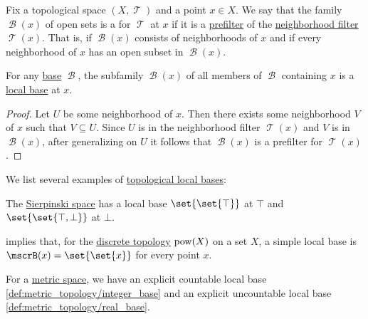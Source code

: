 \begin{definition}\label{def:topological_local_base}
  Fix a topological space \( (X, \mscrT) \) and a point \( x \in X \). We say that the family \( \mscrB(x) \) of open sets is a  for \( \mscrT \) at \( x \) if it is a \hyperref[def:prefilter]{prefilter} of the \hyperref[def:neighborhood_system]{neighborhood filter} \( \mscrT(x) \). That is, if \( \mscrB(x) \) consists of neighborhoods of \( x \) and if every neighborhood of \( x \) has an open subset in \( \mscrB(x) \).
\end{definition}

\begin{proposition}\label{thm:global_base_to_local_base}
  For any \hyperref[def:topological_base]{base} \( \mscrB \), the subfamily \( \mscrB(x) \) of all members of \( \mscrB \) containing \( x \) is a \hyperref[def:topological_local_base]{local base} at \( x \).
\end{proposition}
\begin{proof}
  Let \( U \) be some neighborhood of \( x \). Then there exists some neighborhood \( V \) of \( x \) such that \( V \subseteq U \). Since \( U \) is in the neighborhood filter \( \mscrT(x) \) and \( V \) is in \( \mscrB(x) \), after generalizing on \( U \) it follows that \( \mscrB(x) \) is a prefilter for \( \mscrT(x) \).
\end{proof}

\begin{example}\label{ex:def:topological_local_base}
  We list several examples of \hyperref[def:topological_local_base]{topological local bases}:
  \begin{thmenum}
     The \hyperref[def:sierpinski_space]{Sierpinski space} has a local base \( \set{ \set{ \top } } \) at \( \top \) and \( \set{ \set{ \top, \bot } } \) at \( \bot \).

      implies that, for the \hyperref[def:discrete_topology]{discrete topology} \( \operatorname{pow}(X) \) on a set \( X \), a simple local base is \( \mscrB(x) = \set{ \set{ x } } \) for every point \( x \).

     For a \hyperref[def:metric_space]{metric space}, we have an explicit countable local base \eqref{def:metric_topology/integer_base} and an explicit uncountable local base \eqref{def:metric_topology/real_base}.
  \end{thmenum}
\end{example}

